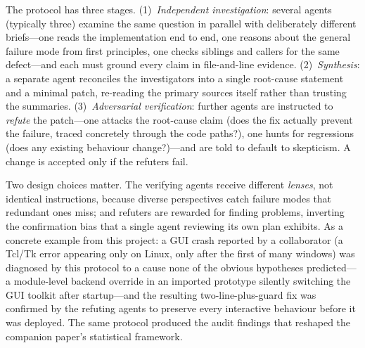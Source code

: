 \documentclass[twocolumn]{aastex631}
\newcommand{\TODOcite}[1]{\textbf{\textcolor{blue}{[cite: #1]}}}
\begin{document}
The protocol has three stages. (1)~\emph{Independent investigation}: several agents
(typically three) examine the same question in parallel with deliberately different
briefs---one reads the implementation end to end, one reasons about the general
failure mode from first principles, one checks siblings and callers for the same
defect---and each must ground every claim in file-and-line evidence. (2)~\emph{Synthesis}:
a separate agent reconciles the investigators into a single root-cause statement
and a minimal patch, re-reading the primary sources itself rather than trusting the
summaries. (3)~\emph{Adversarial verification}: further agents are instructed to
\emph{refute} the patch---one attacks the root-cause claim (does the fix actually
prevent the failure, traced concretely through the code paths?), one hunts for
regressions (does any existing behaviour change?)---and are told to default to
skepticism. A change is accepted only if the refuters fail.

Two design choices matter. The verifying agents receive different \emph{lenses},
not identical instructions, because diverse perspectives catch failure modes that
redundant ones miss; and refuters are rewarded for finding problems, inverting the
confirmation bias that a single agent reviewing its own plan exhibits. As a
concrete example from this project: a GUI crash reported by a collaborator
(a Tcl/Tk error appearing only on Linux, only after the first of many windows)
was diagnosed by this protocol to a cause none of the obvious hypotheses
predicted---a module-level backend override in an imported prototype silently
switching the GUI toolkit after startup---and the resulting two-line-plus-guard
fix was confirmed by the refuting agents to preserve every interactive behaviour
before it was deployed. The same protocol produced the audit findings that
reshaped the companion paper's statistical framework.


\end{document}
